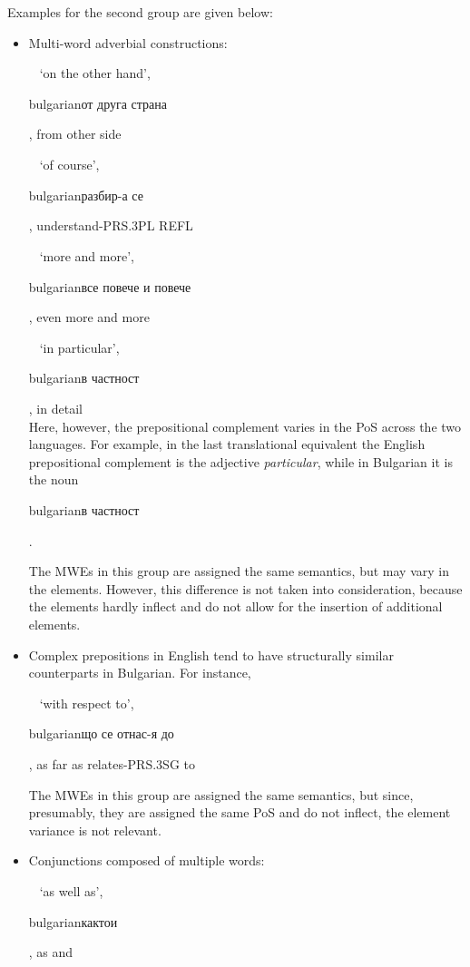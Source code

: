 \documentclass[output=paper]{langsci/langscibook}
\begin{document}
Examples for the second group are given below:

\begin{itemize}
\item Multi-word adverbial constructions:

\verb+ + `on the other hand', \begin{otherlanguage*}{bulgarian}от
друга страна\end{otherlanguage*}, from other side

\verb+ + `of course',  \begin{otherlanguage*}{bulgarian}разбир-а
се\end{otherlanguage*}, understand-\textsc{PRS.3PL} \textsc{REFL}

\verb+ + `more and more', \begin{otherlanguage*}{bulgarian}все
повече и повече\end{otherlanguage*}, even more and more

\verb+ + `in particular',\begin{otherlanguage*}{bulgarian}в
частност\end{otherlanguage*}, in detail\\
Here, however, the prepositional complement varies in the PoS across the two languages. For example, in the last translational equivalent the English
prepositional complement  is the adjective \textit{particular}, while in Bulgarian it is the  noun \begin{otherlanguage*}{bulgarian}в
частност\end{otherlanguage*}.

The MWEs in this group are assigned the same semantics, but may vary in the
elements. However, this difference is not taken into consideration, because
the elements hardly inflect and do not
allow for the insertion of additional elements.

\item Complex prepositions in English tend to have structurally similar
counterparts in Bulgarian. For instance,

\verb+ + `with respect to', \begin{otherlanguage*}{bulgarian}що се
отнас-я до\end{otherlanguage*}, as far as relates-\textsc{PRS.3SG} to

The MWEs in this group are assigned the same semantics, but since, presumably, they are assigned the same PoS and do not inflect, the element variance is not relevant.

\item Conjunctions composed of multiple words:

\verb+ + `as well as',  \begin{otherlanguage*}{bulgarian}кактои\end{otherlanguage*}, as and
\end{itemize}
\end{document}
